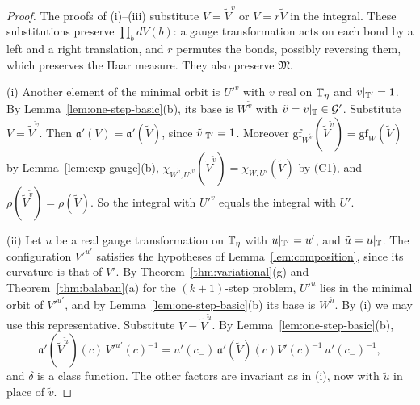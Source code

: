 \begin{proof}
The proofs of (i)--(iii) substitute $V=\tilde V^{v}$ or $V=r\tilde V$ in the integral. These substitutions preserve $\prod_bdV(b)$: a gauge transformation acts on each bond by a left and a right translation, and $r$ permutes the bonds, possibly reversing them, which preserves the Haar measure. They also preserve $\mathfrak M$.

(i) Another element of the minimal orbit is $U'^v$ with $v$ real on $\mathbb T_\eta$ and $v|_{\mathbb T'}=1$. By Lemma~\ref{lem:one-step-basic}(b), its base is $W^{\tilde v}$ with $\tilde v=v|_\mathbb T\in\mathcal G'$. Substitute $V=\tilde V^{\tilde v}$. Then $\mathfrak a'(V)=\mathfrak a'(\tilde V)$, since $\tilde v|_{\mathbb T'}=1$. Moreover $\mathrm{gf}_{W^{\tilde v}}(\tilde V^{\tilde v})=\mathrm{gf}_W(\tilde V)$ by Lemma~\ref{lem:exp-gauge}(b), $\chi_{W^{\tilde v},U'^v}(\tilde V^{\tilde v})=\chi_{W,U'}(\tilde V)$ by (C1), and $\rho(\tilde V^{\tilde v})=\rho(\tilde V)$. So the integral with $U'^v$ equals the integral with $U'$.

(ii) Let $u$ be a real gauge transformation on $\mathbb T_\eta$ with $u|_{\mathbb T'}=u'$, and $\tilde u=u|_\mathbb T$. The configuration $V'^{u'}$ satisfies the hypotheses of Lemma~\ref{lem:composition}, since its curvature is that of $V'$. By Theorem~\ref{thm:variational}(g) and Theorem~\ref{thm:balaban}(a) for the $(k+1)$-step problem, $U'^u$ lies in the minimal orbit of $V'^{u'}$, and by Lemma~\ref{lem:one-step-basic}(b) its base is $W^{\tilde u}$. By (i) we may use this representative. Substitute $V=\tilde V^{\tilde u}$. By Lemma~\ref{lem:one-step-basic}(b),
\[
\mathfrak a'(\tilde V^{\tilde u})(c)\,V'^{u'}(c)^{-1}=u'(c_-)\,\mathfrak a'(\tilde V)(c)V'(c)^{-1}\,u'(c_-)^{-1},
\]
and $\delta$ is a class function. The other factors are invariant as in (i), now with $\tilde u$ in place of $\tilde v$.


\end{proof}
